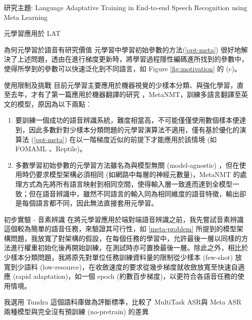 \documentclass[12pt,UTF8,fntef]{article}
\begin{document}
\begin{section}{研究主題: Language Adaptative Training in End-to-end Speech Recognition using Meta Learning}
\begin{subsection}{元學習應用於 LAT}
\begin{subsubsection}{為何元學習於語音有研究價值}
      元學習中學習初始參數的方法(\ref{opt-meta}) 很好地解決了上述問題，透由在進行梯度更新時，將學習過程隱性編碼進所找到的參數中，使得所學到的參數可以快速泛化到不同語言，如 Figure \ref{fig:motivation} 的 (c)。
    \end{subsubsection}
    \begin{subsubsection}{使用限制及挑戰} \label{meta-problem}
      目前元學習主要應用於機器視覺的少樣本分類、與強化學習，直至去年，才有了第一篇應用於機器翻譯的研究 \cite{gu2018meta}，MetaNMT，訓練多語言翻譯至英文的模型，原因為以下兩點︰
      \begin{enumerate}[itemsep=-1mm]
        \item 要訓練一個成功的語音辨識系統，難度相當高，不可能僅僅使用數個樣本便達到，因此多數針對少樣本分類問題的元學習演算法不適用，僅有基於優化的演算法 (\ref{opt-meta}) 在以一階梯度近似的前提下才能應用於該情境 (如 FOMAML \cite{finn2017model}、Reptile\cite{nichol2018first})。
        \item 多數學習初始參數的元學習方法雖名為與模型無關 (model-agnostic) ，但在使用時仍要求模型架構必須相同 (如網路中每層的神經元數量)，MetaNMT 的處理方式為先將所有語言映射到相同空間，使得輸入層一致進而達到全模型一致；但在語音辨識中，雖然不同語言的輸入同為相同維度的語音特徵，輸出卻是每個語言都不同，因此無法直接套用元學習。
      \end{enumerate}
    \end{subsubsection}
    \begin{subsubsection}{初步實驗 - 音素辨識}
      在將元學習應用於端對端語音辨識之前，我先嘗試音素辨識這個較為簡單的語音任務，來驗證其可行性，如 \ref{meta-problem} 所提到的模型架構問題，我放寬了對架構的假設，在每個任務的學習中，允許最後一層以同樣的方法進行權重初始化後再開始訓練，在測試時亦可置換最後一層。除此之外，相比於少樣本分類問題，我將原先對單位任務訓練資料量的限制從少樣本 (few-shot) 放寬到少語料 (low-resource)，在收斂速度的要求從幾步梯度就收斂放寬至快速自適應 (rapid adaptation)，如一個 epoch (約數百步梯度)，以更符合各語音任務的使用情境。

      我選用 Tundra 這個語料庫做為評斷標準，比較了 MultiTask ASR與 Meta ASR 兩種模型與完全沒有預訓練 (no-pretrain) 的差異
      \begin{figure}[H]
    \centering
    \hspace{-5.2cm}
\end{figure}
\end{subsubsection}
\end{subsection}
\end{section}
\end{document}
